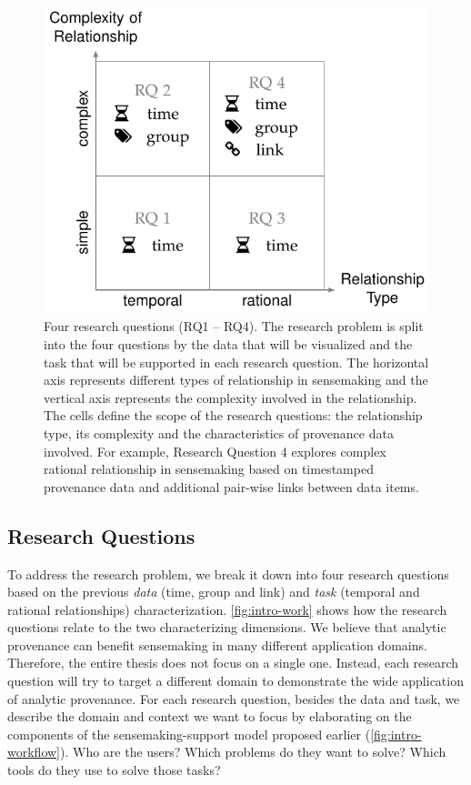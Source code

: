 \begin{figure}[!htb]
	\centering
	\includegraphics{work}
	\caption[Four research questions]{Four research questions (RQ1 -- RQ4). The research problem is split into the four questions by the data that will be visualized and the task that will be supported in each research question. The horizontal axis represents different types of relationship in sensemaking and the vertical axis represents the complexity involved in the relationship. The cells define the scope of the research questions: the relationship type, its complexity and the characteristics of provenance data involved. For example, Research Question 4 explores complex rational relationship in sensemaking based on timestamped provenance data and additional pair-wise links between data items.}
	\label{fig:intro-work}
\end{figure}

\subsection{Research Questions}
\label{intro:questions}
To address the research problem, we break it down into four research questions based on the previous \emph{data} (time, group and link) and \emph{task} (temporal and rational relationships) characterization. \autoref{fig:intro-work} shows how the research questions relate to the two characterizing dimensions. We believe that analytic provenance can benefit sensemaking in many different application domains. Therefore, the entire thesis does not focus on a single one. Instead, each research question will try to target a different domain to demonstrate the wide application of analytic provenance. For each research question, besides the data and task, we describe the domain and context we want to focus by elaborating on the components of the sensemaking-support model proposed earlier (\autoref{fig:intro-workflow}). Who are the users? Which problems do they want to solve? Which tools do they use to solve those tasks?

